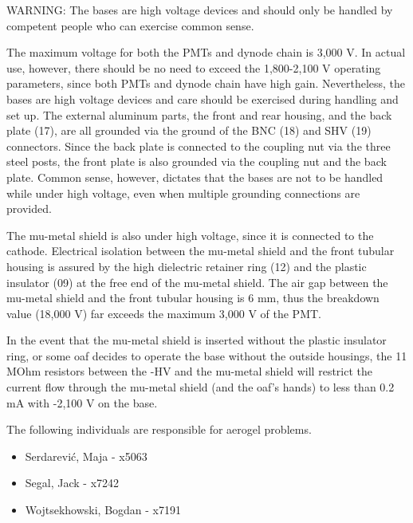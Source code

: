 
WARNING: The bases are high voltage devices and should only be handled by 
competent people who can exercise common sense.

   The maximum voltage for both the PMTs and dynode chain is 3,000 V. In actual 
use, however, there should be no need to exceed the 1,800-2,100 V operating 
parameters, since both PMTs and dynode chain have high gain. Nevertheless, the 
bases are high voltage devices and care should be exercised during handling and 
set up. The external aluminum parts, the front and rear housing, and the back 
plate (17), are all grounded via the ground of the BNC (18) and SHV (19) 
connectors. Since the back plate is connected to the coupling nut via the three 
steel posts, the front plate is also grounded via the coupling nut and the back 
plate. Common sense, however, dictates that the bases are not to be handled     
while under high voltage, even when multiple grounding connections are provided.

The mu-metal shield is also under high voltage, since it is connected to the 
cathode. Electrical isolation between the mu-metal shield and the front 
tubular housing is assured by the high dielectric retainer ring (12) and the 
plastic insulator (09) at the free end of the mu-metal shield. The air gap 
between the mu-metal shield and the front tubular housing is 6 mm, thus the 
breakdown value (18,000 V) far exceeds the maximum 3,000 V of the PMT.

In the event that the mu-metal shield is inserted without the plastic insulator 
ring, or some oaf decides to operate the base without the outside housings, the 
11 MOhm resistors between the -HV and the mu-metal shield will restrict the 
current flow through the mu-metal shield (and the oaf's hands) to less than 0.2 
mA with -2,100 V on the base. 

The following individuals are responsible for aerogel \Cerenkov problems. 
\begin{itemize}
\item[~]Serdarevi\'c, Maja - x5063
\item[~]Segal, Jack - x7242 
\item[~]Wojtsekhowski, Bogdan - x7191 
\end{itemize} 








